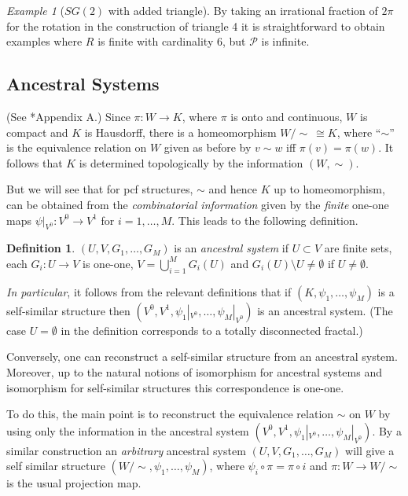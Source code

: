 \documentclass[a4paper]{amsart}
\theoremstyle{plain}
\theoremstyle{definition}
\newtheorem{definition}[theorem]{Definition}%
\theoremstyle{remark}
\newtheorem{example}[theorem]{Example}
\begin{document}
\begin{example}[$ SG(2) $ with added triangle]
By taking an irrational fraction of $ 2\pi $ for the rotation in the construction of triangle 4 it is straightforward to  obtain examples where $ R $ is finite with cardinality 6, but $ \mathcal{P} $ is infinite.   
\end{example} 

\subsection{Ancestral Systems}  \label{secas} (See \cite{Kig2}*{Appendix A}.) Since $ \pi:W \to K $, where $ \pi $ is onto and continuous, $ W $ is compact and $ K $ is Hausdorff, there is a  homeomorphism  $  W/\!\! \sim\  \cong K $, where ``$ \sim $'' is the equivalence relation on $ W $ given as before by $ v \sim w$ iff $ \pi (v) =\pi (w) $.   It follows that $ K$ is determined topologically by the information $(W, \sim )$.

But we will see that for pcf structures, $ \sim $ and hence $ K$  up to homeomorphism,  can be obtained from  the \emph{combinatorial information} 
given by the \emph{finite} one-one maps $ \psi|_{V^{0}} : V^{0} \to V^{1} $ for $ i=1,\dots , M $.  This leads to the following definition.

\begin{definition}
 $ (U,V, G_1,\dots ,G_M) $ is an \emph{ancestral system}   if $U\subset V $ are finite sets, each $ G_i : U \to V $ is one-one, $ V = \bigcup_{i=1}^M G_i(U) $ and  $ G_i(U) \setminus U \neq \emptyset $ if $ U\neq \emptyset  $. 
\end{definition} 

\emph{In particular}, it follows from the relevant definitions that if   $(K,\psi_1,\dots,\psi_M)$ is a self-similar  structure then  $ (V^{0},V^{1},    \psi_1|_{V^{0}} ,\dots ,  \psi_M|_{V^{0}} ) $ is an  ancestral system.   (The case $ U=\emptyset $ in the definition corresponds to a totally disconnected fractal.) 

\medskip Conversely, one can  reconstruct a self-similar  structure from an ancestral system.  Moreover, up to the natural notions  of isomorphism for ancestral systems and isomorphism for self-similar  structures this correspondence  is one-one.  

To do this, the main point is  to  reconstruct the equivalence relation $ \sim  $  on $ W $  by using only the information in the ancestral system
$ (V^{0},V^{1},  \psi_1|_{V^{0}} ,\dots ,  \psi_M|_{V^{0}} ) $.  By a similar construction an \emph{arbitrary} ancestral system  $ (U,V,  G_1,\dots , G_M) $ will give  a self similar structure $( W/\!\! \sim, \psi_1,\dots, \psi_M )$, where $ \psi_i \circ \pi = \pi \circ i $ and   $ \pi : W\to W/\!\! \sim $  is the usual projection map.
\end{document}
